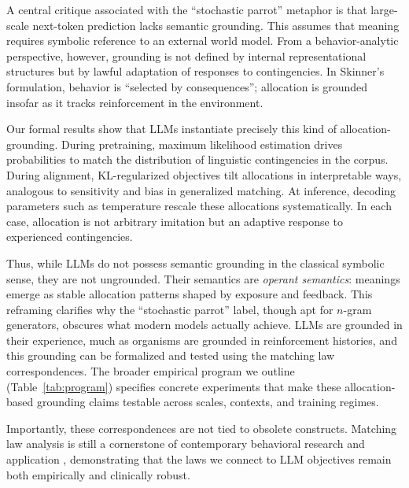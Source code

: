 \documentclass[11pt]{article}
\begin{document}
A central critique associated with the ``stochastic parrot'' metaphor is that
large-scale next-token prediction lacks semantic grounding. This assumes that
meaning requires symbolic reference to an external world model. From a
behavior-analytic perspective, however, grounding is not defined by internal
representational structures but by lawful adaptation of responses to
contingencies. In Skinner’s formulation, behavior is ``selected by
consequences''; allocation is grounded insofar as it tracks reinforcement in the
environment.

Our formal results show that LLMs instantiate precisely this kind of
allocation-grounding. During pretraining, maximum likelihood estimation drives
probabilities to match the distribution of linguistic contingencies in the
corpus. During alignment, KL-regularized objectives tilt allocations in
interpretable ways, analogous to sensitivity and bias in generalized matching.
At inference, decoding parameters such as temperature rescale these allocations
systematically. In each case, allocation is not arbitrary imitation but an
adaptive response to experienced contingencies.

Thus, while LLMs do not possess semantic grounding in the classical symbolic
sense, they are not ungrounded. Their semantics are \emph{operant semantics}:
meanings emerge as stable allocation patterns shaped by exposure and feedback.
This reframing clarifies why the ``stochastic parrot'' label, though apt for
$n$-gram generators, obscures what modern models actually achieve. LLMs are
grounded in their experience, much as organisms are grounded in reinforcement
histories, and this grounding can be formalized and tested using the matching
law correspondences. The broader empirical program we outline
(Table~\ref{tab:program}) specifies concrete experiments that make these
allocation-based grounding claims testable across scales, contexts, and
training regimes.

Importantly, these correspondences are not tied to obsolete
constructs. Matching law analysis is still a cornerstone of
contemporary behavioral research and application
\citep{kronfli2021matching,rajagopalan2023reward,anderson2024texting,mastermind2025matching},
demonstrating that the laws we connect to LLM objectives remain both
empirically and clinically robust.
\end{document}
